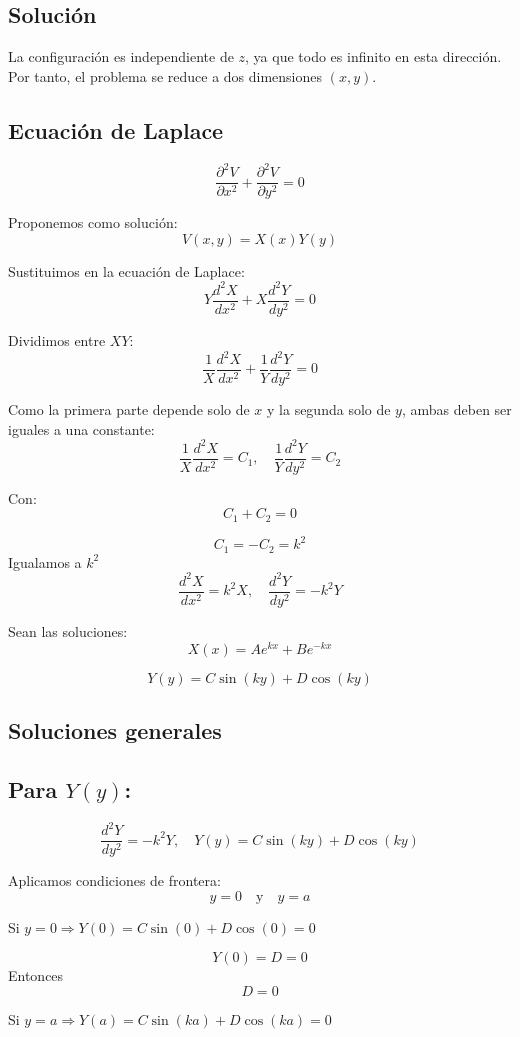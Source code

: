 \documentclass[12pt]{article}
\begin{document}
\subsection*{Solución}

La configuración es independiente de \( z \), ya que todo es infinito en esta dirección.  
Por tanto, el problema se reduce a dos dimensiones \( (x, y) \).

\subsection*{Ecuación de Laplace}
\[
\frac{\partial^2 V}{\partial x^2} + \frac{\partial^2 V}{\partial y^2} = 0
\]

Proponemos como solución:
\[
V(x,y) = X(x)Y(y)
\]

Sustituimos en la ecuación de Laplace:
\[
Y \frac{d^2 X}{d x^2} + X \frac{d^2 Y}{d y^2} = 0
\]

Dividimos entre \( XY \):
\[
\frac{1}{X} \frac{d^2 X}{d x^2} + \frac{1}{Y} \frac{d^2 Y}{d y^2} = 0
\]

Como la primera parte depende solo de \(x\) y la segunda solo de \(y\), ambas deben ser iguales a una constante:
\[
\frac{1}{X} \frac{d^2 X}{d x^2} = C_1, \quad \frac{1}{Y} \frac{d^2 Y}{d y^2} = C_2
\]

Con:
\[
C_1 + C_2 = 0
\]

\[
C_1 = -C_2 = k^2
\]
Igualamos a \(k^2\)
\[
\frac{d^2 X}{d x^2} = k^2 X, \quad \frac{d^2 Y}{d y^2} = -k^2 Y
\]

Sean las soluciones:
\[
X(x) = A e^{k x} + B e^{-k x}
\]

\[
Y(y) = C \sin(k y) + D \cos(k y)
\]


\subsection*{Soluciones generales}

\subsection*{Para \( Y(y) \):}
\[
\frac{d^2 Y}{dy^2} = -k^2 Y, \quad Y(y) = C \sin(ky) + D \cos(ky)
\]

Aplicamos condiciones de frontera:
\[
y = 0 \quad \text{y} \quad y = a
\]

Si \( y=0 \Rightarrow Y(0) = C \sin(0) + D \cos(0) = 0 \)

\[
Y(0) = D = 0
\]
Entonces 
\[
\boxed{D = 0}
\]

Si \(y= a \Rightarrow Y(a) = C \sin(ka) + D \cos(ka) = 0 \) 
\end{document}
